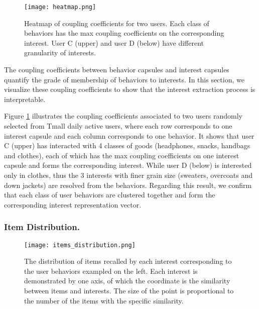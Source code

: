 \documentclass[sigconf]{acmart}
\begin{document}
\begin{figure}[ht]
  \centering
  \texttt{[image: heatmap.png]}
  \caption{Heatmap of coupling coefficients for two users. Each class of behaviors has the max coupling coefficients on the corresponding interest. User C (upper) and user D (below) have different granularity of interests.}
  \label{fig:heatmap}
\end{figure}

The coupling coefficients between behavior capsules and interest capsules quantify the grade of membership of behaviors to interests.
In this section, we visualize these coupling coefficients to show that the interest extraction process is interpretable.

Figure \ref{fig:heatmap} illustrates the coupling coefficients associated to two users randomly selected from Tmall daily active users, where each row corresponds to one interest capsule and each column corresponds to one behavior.
It shows that user C (upper) has interacted with 4 classes of goods (headphones, snacks, handbags and clothes), each of which has the max coupling coefficients on one interest capsule and forms the corresponding interest.
While user D (below) is interested only in clothes, thus the 3 interests with finer grain size (sweaters, overcoats and down jackets) are resolved from the behaviors.
Regarding this result, we confirm that each class of user behaviors are clustered together and form the corresponding interest representation vector.

\subsubsection{Item Distribution.}

\begin{figure}[ht]
  \centering
  \texttt{[image: items\_distribution.png]}
  \caption{The distribution of items recalled by each interest corresponding to the user behaviors exampled on the left. Each interest is demonstrated by one axis, of which the coordinate is the similarity between items and interests. The size of the point is proportional to the number of the items with the specific similarity.}
  \label{fig:distribution}
\end{figure}
\end{document}

